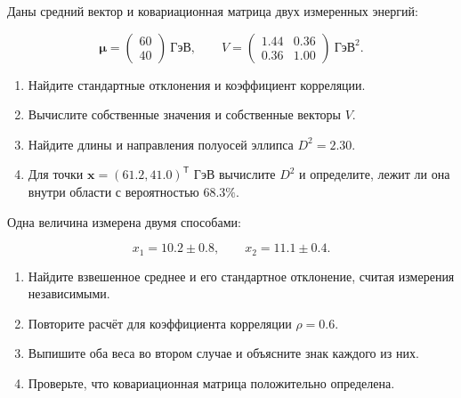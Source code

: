 \documentclass[
  russian,
  11pt,
  a4paper,
  open=any]{scrbook}
\providecommand{\tightlist}{%
  \setlength{\itemsep}{0pt}\setlength{\parskip}{0pt}}
\begin{document}
\begin{semanticpdfbox}[colback=BookCoralSoft,borderline west={1.2mm}{0pt}{BookCoral}]

\par\nopagebreak[4]\vspace{1.2mm}

Даны средний вектор и ковариационная матрица двух измеренных энергий:

\[
\boldsymbol\mu=
\begin{pmatrix}60\\40\end{pmatrix}\ \text{ГэВ},
\qquad
V=
\begin{pmatrix}
1.44&0.36\\
0.36&1.00
\end{pmatrix}\ \text{ГэВ}^2.
\]

\begin{enumerate}
\def\labelenumi{\arabic{enumi}.}
\tightlist
\item
  Найдите стандартные отклонения и коэффициент корреляции.
\item
  Вычислите собственные значения и собственные векторы \(V\).
\item
  Найдите длины и направления полуосей эллипса \(D^2=2.30\).
\item
  Для точки \(\mathbf x=(61.2,41.0)^{\mathsf T}\) ГэВ вычислите \(D^2\)
  и определите, лежит ли она внутри области с вероятностью \(68.3\%\).
\end{enumerate}

\end{semanticpdfbox}

\begin{semanticpdfbox}[colback=BookCoralSoft,borderline west={1.2mm}{0pt}{BookCoral}]

\par\nopagebreak[4]\vspace{1.2mm}

Одна величина измерена двумя способами:

\[
x_1=10.2\pm0.8,
\qquad
x_2=11.1\pm0.4.
\]

\begin{enumerate}
\def\labelenumi{\arabic{enumi}.}
\tightlist
\item
  Найдите взвешенное среднее и его стандартное отклонение, считая
  измерения независимыми.
\item
  Повторите расчёт для коэффициента корреляции \(\rho=0.6\).
\item
  Выпишите оба веса во втором случае и объясните знак каждого из них.
\item
  Проверьте, что ковариационная матрица положительно определена.
\end{enumerate}

\end{semanticpdfbox}
\end{document}
